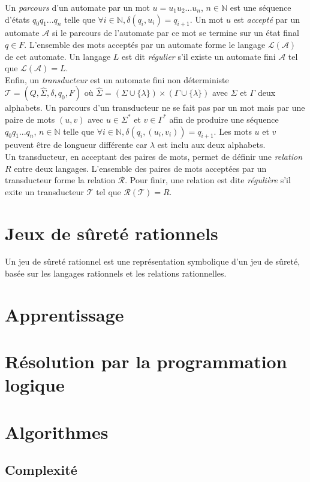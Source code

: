 \documentclass[12pt,a4paper,oneside,titlepage]{report}
\begin{document}
\noindent Un \emph{parcours} d'un automate par un mot $u=u_1u_2...u_n$, $n\in\mathbb{N}$ est une séquence d'états $q_0q_1...q_n$ telle que $\forall i\in\mathbb{N}, \delta(q_i,u_i)=q_{i+1}$. Un mot $u$ est \emph{accepté} par un automate $\mathcal{A}$ si le parcours de l'automate par ce mot se termine sur un état final $q\in F$. L'ensemble des mots acceptés par un automate forme le langage $\mathcal{L}(\mathcal{A})$ de cet automate. Un langage $L$ est dit \emph{régulier} s'il existe un automate fini $\mathcal{A}$ tel que $\mathcal{L}(\mathcal{A})=L$.\\

\noindent Enfin, un \emph{transducteur} est un automate fini non déterministe $\mathcal{T}=(Q,\hat{\Sigma},\delta,q_0,F)$ où $\hat{\Sigma}=(\Sigma\cup\{\lambda\})\times(\Gamma\cup\{\lambda\})$ avec $\Sigma$ et $\Gamma$ deux alphabets. Un parcours d'un transducteur ne se fait pas par un mot mais par une paire de mots $(u,v)$ avec $u\in\Sigma^*$ et $v\in\Gamma^*$ afin de produire une séquence $q_0q_1...q_n$, $n\in\mathbb{N}$ telle que $\forall i\in\mathbb{N}, \delta(q_i,(u_i,v_i))=q_{i+1}$. Les mots $u$ et $v$ peuvent être de longueur différente car $\lambda$ est inclu aux deux alphabets.\\
Un transducteur, en acceptant des paires de mots, permet de définir une \emph{relation} $R$ entre deux langages. L'ensemble des paires de mots acceptées par un transducteur forme la relation $\mathcal{R}$. Pour finir, une relation est dite \emph{régulière} s'il exite un transducteur $\mathcal{T}$ tel que $\mathcal{R}(\mathcal{T})=R$.

\section{Jeux de sûreté rationnels}
Un jeu de sûreté rationnel est une représentation symbolique d'un jeu de sûreté, basée sur les langages rationnels et les relations rationnelles.
\section{Apprentissage}
\section{Résolution par la programmation logique}
\section{Algorithmes}
\subsection{Complexité}
\end{document}
